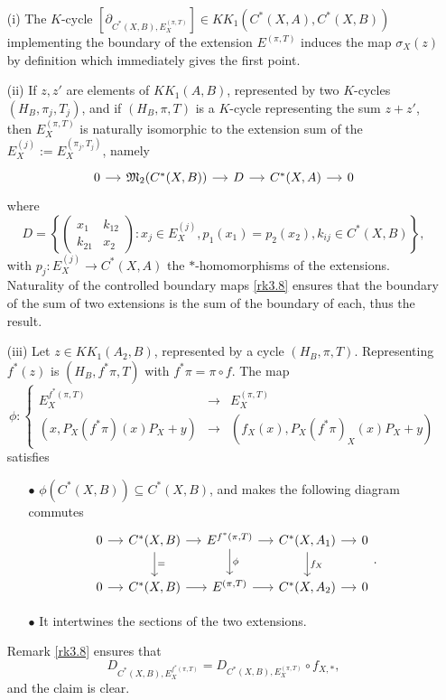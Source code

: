 \begin{dem}
\begin{enumerate}

\item[(i)]The $K$-cycle $[\partial_{C^*(X,B),E_X^{(\pi,T)}}]\in KK_1(C^*(X,A), C^*(X,B))$ implementing the boundary of the extension $E^{(\pi,T)}$ induces the map $\sigma_X(z)$ by definition which immediately gives the first point.

\item[(ii)] If $z,z'$ are elements of $KK_1(A,B)$, represented by two $K$-cycles $(H_B,\pi_j,T_j)$, and if $(H_B,\pi,T)$ is a $K$-cycle representing the sum $z+z'$, then $E_X^{(\pi,T)}$ is naturally isomorphic to the extension sum of the $E_X^{(j)}:=E_X^{(\pi_j,T_j)}$, namely
\[\begin{tikzcd}[column sep = small]
0\arrow{r} & \mathfrak M_2( C^*(X,B)) \arrow{r} & D \arrow{r} & C^*(X,A) \arrow{r} & 0
\end{tikzcd}\]
where 
\[D=\left\{\begin{pmatrix}x_1 & k_{12}\\ k_{21} & x_2\end{pmatrix} : x_j\in E_X^{(j)} , p_1(x_1)=p_2(x_2), k_{ij}\in C^*(X,B)\right\},\]
with $p_j : E_X^{(j)}\rightarrow C^*(X,A)$ the $*$-homomorphisms of the extensions. Naturality of the controlled boundary maps \ref{rk3.8} ensures that the boundary of the sum of two extensions is the sum of the boundary of each, thus the result.

\item[(iii)] Let $z\in KK_1(A_2,B)$, represented by a cycle $(H_B,\pi,T)$. Representing $f^*(z)$ is $(H_B,f^*\pi,T)$ with $f^*\pi=\pi \circ f$. The map 
\[\phi : \left\{\begin{array}{lll} E_X^{f^*(\pi,T)} & \rightarrow & E_X^{(\pi,T)} \\
( x, P_X(f^*\pi)(x)P_X+y) & \rightarrow & ( f_X(x), P_X(f^*\pi)_X(x)P_X+y) \end{array}\right. \]
satisfies
\begin{enumerate}
\item[$\bullet$] $\phi(C^*(X,B))\subseteq C^*(X,B)$, and makes the following diagram commutes
\[\begin{tikzcd}[column sep = small]
0\arrow{r} & C^*(X,B)\arrow{r}\arrow{d}{=} & E^{f^*(\pi,T)} \arrow{r}\arrow{d}{\phi}& C^*(X,A_1)\arrow{r}\arrow{d}{f_X} & 0\\
0\arrow{r} & C^*(X,B)\arrow{r} & E^{(\pi,T)} \arrow{r}& C^*(X,A_2)\arrow{r} & 0
\end{tikzcd}.\]
\item[$\bullet$] It intertwines the sections of the two extensions.
\end{enumerate}
Remark \ref{rk3.8} ensures that \[D_{C^*(X,B), E_X^{f^*(\pi,T)} } =  D_{C^*(X,B), E_X^{(\pi,T)} }\circ f_{X,*},\] 
and the claim is clear. %


\end{enumerate}
\end{dem}
